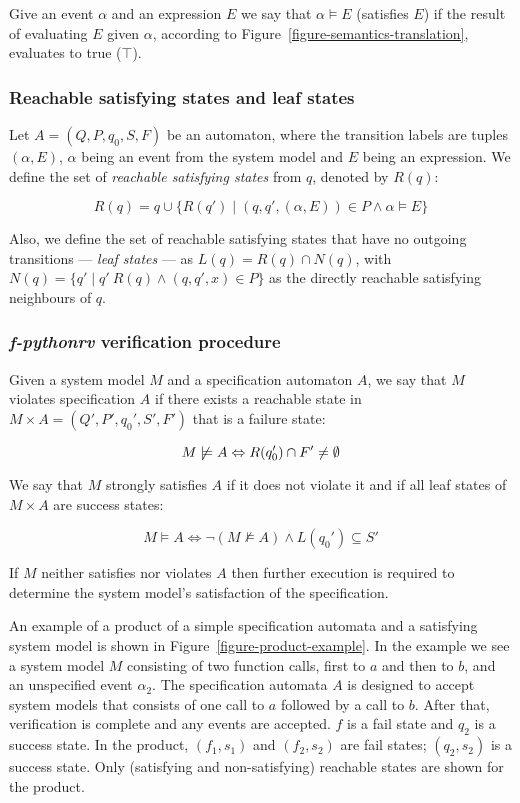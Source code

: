 Give an event $\alpha$ and an expression $E$ we say that $\alpha \models E$
(satisfies $E$) if the result of evaluating $E$ given $\alpha$, according to
Figure~\ref{figure-semantics-translation}, evaluates to true ($\top$).


\subsubsection{Reachable satisfying states and leaf states}

Let $A = (Q,P,q_0,S,F)$ be an automaton, where the transition labels are tuples
$(\alpha, E)$, $\alpha$ being an event from the system model and $E$ being an
expression. We define the set of \textit{reachable satisfying states} from $q$,
denoted by $R(q)$:

\medskip
\[
  R(q) = q \cup \{R(q') \; | \; (q,q',(\alpha,E)) \in P \wedge \alpha \models E\}
\]
\medskip

Also, we define the set of reachable satisfying states that have no outgoing
transitions --- \textit{leaf states} --- as $L(q) = R(q) \cap N(q)$, with $N(q)
= \{q' \; | \; q' \ R(q) \wedge (q,q',x) \in P\}$ as the directly reachable
satisfying neighbours of $q$.


\subsubsection{\textit{f-pythonrv} verification procedure}

Given a system model $M$ and a specification automaton $A$, we say that $M$
violates specification $A$ if there exists a reachable state in $M \times A = (Q',
P', q_0', S', F')$ that is a failure state:

\medskip
\[
  M \not\models A \Leftrightarrow R(q_0') \cap F' \neq \emptyset \\
\]
\medskip

We say that $M$ strongly satisfies $A$ if it does not violate it and if all
leaf states of $M \times A$ are success states:

\medskip
\[
  M \models A \Leftrightarrow \neg(M \not\models A) \wedge L(q_0') \subseteq S'
\]
\medskip

If $M$ neither satisfies nor violates $A$ then further execution is required to
determine the system model's satisfaction of the specification.

An example of a product of a simple specification automata and a satisfying
system model is shown in Figure~\ref{figure-product-example}. In the example we
see a system model $M$ consisting of two function calls, first to $a$ and then
to $b$, and an unspecified event $\alpha_2$. The specification automata $A$ is
designed to accept system models that consists of one call to $a$ followed by a
call to $b$. After that, verification is complete and any events are accepted.
$f$ is a fail state and $q_2$ is a success state. In the product, $(f_1,s_1)$
and $(f_2,s_2)$ are fail states; $(q_2,s_2)$ is a success state. Only
(satisfying and non-satisfying) reachable states are shown for the product.

